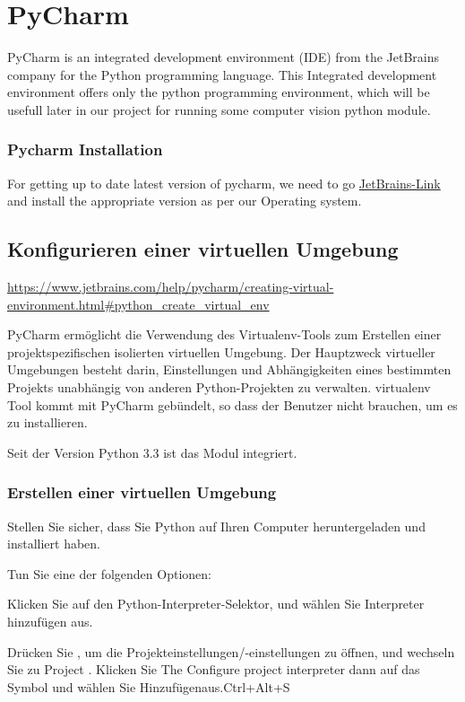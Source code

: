 %
%
%


\chapter{PyCharm}

PyCharm is an integrated development environment (IDE) from the JetBrains company for the Python programming language. This Integrated development environment offers only the python programming environment, which will be usefull later in our project for running some computer vision python module.


\subsection{Pycharm Installation}

For getting up to date latest version of pycharm, we need to go \href{https://www.jetbrains.com/pycharm/download/#section=windows}{JetBrains-Link} and install the appropriate version as per our Operating system. 



\section{Konfigurieren einer virtuellen Umgebung}

\url{https://www.jetbrains.com/help/pycharm/creating-virtual-environment.html#python_create_virtual_env}


PyCharm ermöglicht die Verwendung des Virtualenv-Tools zum Erstellen einer projektspezifischen isolierten virtuellen Umgebung. Der Hauptzweck virtueller Umgebungen besteht darin, Einstellungen und Abhängigkeiten eines bestimmten Projekts unabhängig von anderen Python-Projekten zu verwalten. virtualenv Tool kommt mit PyCharm gebündelt, so dass der Benutzer nicht brauchen, um es zu installieren.

Seit der Version Python 3.3 ist das Modul  integriert.

\subsection{Erstellen einer virtuellen Umgebung}
 
\begin{enumerate} 
Stellen Sie sicher, dass Sie Python auf Ihren Computer heruntergeladen und installiert haben.

Tun Sie eine der folgenden Optionen:

Klicken Sie auf den Python-Interpreter-Selektor, und wählen Sie Interpreter hinzufügen aus.

Drücken Sie , um die Projekteinstellungen/-einstellungen zu öffnen, und wechseln Sie zu Project . Klicken Sie The Configure project interpreter dann auf das Symbol und wählen Sie Hinzufügenaus.Ctrl+Alt+S



\end{enumerate}

